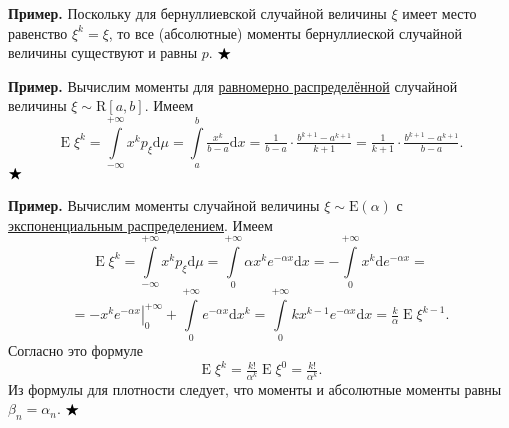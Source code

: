 \documentclass[12pt]{article}
\numberwithin{theorem}{section}
\theoremstyle{definition}
\newenvironment{example}{\indent \textbf{Пример.}}{$ \hfill \bigstar $}
\newcommand{\expect}{\operatorname{E}}
\newcommand{\diff}{\mathrm{d}}
\begin{document}
	\begin{example}
		Поскольку для бернуллиевской случайной величины $ \xi $ имеет место равенство
		$ \xi^k = \xi $, то все (абсолютные) моменты бернуллиеской случайной величины существуют и равны $ p $.
	\end{example}
	
	\begin{example}
		Вычислим моменты для 
		\hyperlink{uniformly-distributed}{равномерно распределённой} случайной величины $ \xi \sim \mathrm{R}[a, b] $.
		Имеем
		$$ \expect\xi^k = \int\limits_{-\infty}^{+\infty} x^k p_\xi \diff\mu
		= \int\limits_{a}^{b} \tfrac{x^k}{b - a} \diff x
		= \tfrac{1}{b - a} \cdot \tfrac{b^{k + 1} - a^{k + 1}}{k + 1}
		= \tfrac{1}{k + 1} \cdot \tfrac{b^{k + 1} - a^{k + 1}}{b - a}. $$
	\end{example}
	
	\begin{example}
		Вычислим моменты случайной величины $ \xi \sim \mathrm{E}(\alpha) $ 
		с \hyperlink{exponential-distribution}{экспоненциальным распределением}.
		Имеем
		$$ \expect\xi^k = \int\limits_{-\infty}^{+\infty} x^k p_\xi \diff\mu
		= \int\limits_{0}^{+\infty} \alpha x^k e^{-\alpha x} \diff x
		= -\int\limits_{0}^{+\infty} x^k \diff e^{-\alpha x} = $$ 
		$$ = \left.-x^ke^{-\alpha x}\right|_{0}^{+\infty} 
		+ \int\limits_{0}^{+\infty} e^{-\alpha x}\diff x^k
		= \int\limits_{0}^{+\infty} kx^{k - 1} e^{-\alpha x}\diff x
		= \tfrac{k}{\alpha}\expect\xi^{k - 1}. $$
		Согласно это формуле
		$$ \expect\xi^k = \tfrac{k!}{\alpha^k} \expect\xi^0 = \tfrac{k!}{\alpha^k}. $$
		Из формулы для плотности следует, что моменты и абсолютные моменты равны $ \beta_n = \alpha_n $.
	\end{example}
	
\end{document}

